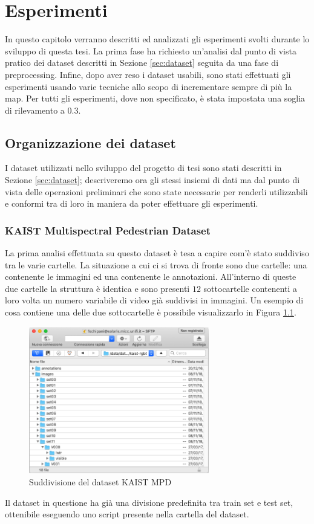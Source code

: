 \chapter{Esperimenti}
\label{chap:experiment}
In questo capitolo verranno descritti ed analizzati gli esperimenti svolti durante lo sviluppo di questa tesi. La prima fase ha richiesto un'analisi dal punto di vista pratico dei dataset descritti in Sezione \ref{sec:dataset} seguita da una fase di preprocessing. 
Infine, dopo aver reso i dataset usabili, sono stati effettuati gli esperimenti usando varie tecniche allo scopo di incrementare sempre di più la \acl{map}. Per tutti gli esperimenti, dove non specificato, è stata impostata una soglia di rilevamento a $0.3$.
\section{Organizzazione dei dataset}
\label{sec:dataset_org}
I dataset utilizzati nello sviluppo del progetto di tesi sono stati descritti in Sezione \ref{sec:dataset}; descriveremo ora gli stessi insiemi di dati ma dal punto di vista delle operazioni preliminari che sono state necessarie per renderli utilizzabili e conformi tra di loro in maniera da poter effettuare gli esperimenti. 
\subsection{KAIST Multispectral Pedestrian Dataset}
\label{subsec:kaist_experiment}
La prima analisi effettuata su questo dataset è tesa a capire com'è stato suddiviso tra le varie cartelle. La situazione a cui ci si trova di fronte sono due cartelle: una contenente le immagini ed una contenente le annotazioni. All'interno di queste due cartelle la struttura è identica e sono presenti $12$ sottocartelle contenenti a loro volta un numero variabile di video già suddivisi in immagini. Un esempio di cosa contiene una delle due sottocartelle è possibile visualizzarlo in Figura \ref{fig:kaist_dataset_folder}.
\begin{figure}
    \centering
    \includegraphics[width=0.7\textwidth]{images/screen_kaist.png}
    \caption{Suddivisione del dataset KAIST MPD}
    \label{fig:kaist_dataset_folder}
\end{figure} 
Il dataset in questione ha già una divisione predefinita tra train set e test set, ottenibile eseguendo uno script presente nella cartella del dataset. 

